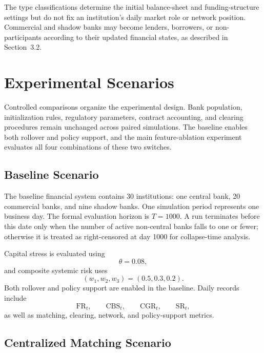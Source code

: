 The type classifications determine the initial balance-sheet and
funding-structure settings but do not fix an institution's daily market
role or network position. Commercial and shadow banks may become
lenders, borrowers, or non-participants according to their updated
financial states, as described in Section~3.2.

\section{Experimental Scenarios}

Controlled comparisons organize the experimental design. Bank
population, initialization rules, regulatory parameters, contract
accounting, and clearing procedures remain unchanged across paired
simulations. The baseline enables both rollover and policy support, and
the main feature-ablation experiment evaluates all four combinations of
these two switches.

\subsection{Baseline Scenario}

The baseline financial system contains 30 institutions: one central
bank, 20 commercial banks, and nine shadow banks. One simulation period
represents one business day. The formal evaluation horizon is
\(T=1000\). A run terminates before this date only when the number of
active non-central banks falls to one or fewer; otherwise it is treated
as right-censored at day 1000 for collapse-time analysis.

Capital stress is evaluated using
\begin{equation}
\theta=0.08,
\end{equation}
and composite systemic risk uses
\begin{equation}
\left(w_1,w_2,w_3\right)=\left(0.5,0.3,0.2\right).
\end{equation}
Both rollover and policy support are enabled in the baseline. Daily
records include
\begin{equation}
\mathrm{FR}_t,\qquad\mathrm{CBS}_t,\qquad\mathrm{CGR}_t,\qquad\mathrm{SR}_t,
\end{equation}
as well as matching, clearing, network, and policy-support metrics.

\subsection{Centralized Matching Scenario}

